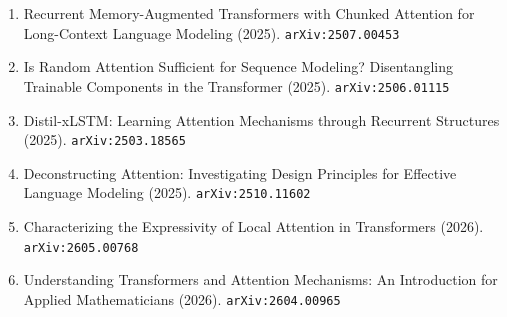 \documentclass[11pt]{article}
\begin{document}
\begin{enumerate}
  \item Recurrent Memory-Augmented Transformers with Chunked Attention for Long-Context Language Modeling (2025). \texttt{arXiv:2507.00453}
  \item Is Random Attention Sufficient for Sequence Modeling? Disentangling Trainable Components in the Transformer (2025). \texttt{arXiv:2506.01115}
  \item Distil-xLSTM: Learning Attention Mechanisms through Recurrent Structures (2025). \texttt{arXiv:2503.18565}
  \item Deconstructing Attention: Investigating Design Principles for Effective Language Modeling (2025). \texttt{arXiv:2510.11602}
  \item Characterizing the Expressivity of Local Attention in Transformers (2026). \texttt{arXiv:2605.00768}
  \item Understanding Transformers and Attention Mechanisms: An Introduction for Applied Mathematicians (2026). \texttt{arXiv:2604.00965}
\end{enumerate}
\end{document}
